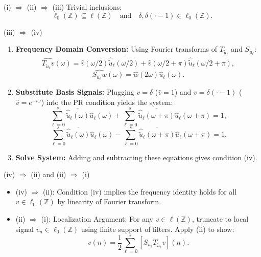 \documentclass{beamer}
\begin{document}
\begin{frame}{(i) $\Rightarrow$ (ii) $\Rightarrow$ (iii)}
    Trivial inclusions:
    \[
        \ell_0(\mathbb{Z})\subseteq \ell(\mathbb{Z})\quad\text{and}\quad \delta,\delta(\cdot-1)\in\ell_0(\mathbb{Z}).
    \]
\end{frame}

\begin{frame}{(iii) $\Rightarrow$ (iv)}
    \begin{enumerate}
        \item \textbf{Frequency Domain Conversion:} Using Fourier transforms of $T_{\tilde{u}_\ell}$ and $S_{u_\ell}$:
              \[
                  \widehat{T_{\tilde{u}_\ell} v}(\omega) = \hat{v}(\omega/2)\overline{\hat{\tilde{u}}_\ell(\omega/2)} + \hat{v}(\omega/2+\pi)\overline{\hat{\tilde{u}}_\ell(\omega/2+\pi)},
              \]
              \[
                  \widehat{S_{u_\ell} w}(\omega) = \hat{w}(2\omega)\hat{u}_\ell(\omega).
              \]

        \item \textbf{Substitute Basis Signals:} Plugging $v = \delta$ ($\hat{v}=1$) and $v = \delta(\cdot-1)$ ($\hat{v}=e^{-i\omega}$) into the PR condition yields the system:
              \[
                  \sum_{\ell=0}^s \overline{\hat{\tilde{u}}_\ell(\omega)}\hat{u}_\ell(\omega) + \sum_{\ell=0}^s \overline{\hat{\tilde{u}}_\ell(\omega+\pi)}\hat{u}_\ell(\omega+\pi) = 1,
              \]
              \[
                  \sum_{\ell=0}^s \overline{\hat{\tilde{u}}_\ell(\omega)}\hat{u}_\ell(\omega) - \sum_{\ell=0}^s \overline{\hat{\tilde{u}}_\ell(\omega+\pi)}\hat{u}_\ell(\omega+\pi) = 1.
              \]

        \item \textbf{Solve System:} Adding and subtracting these equations gives condition (iv).
    \end{enumerate}
\end{frame}

\begin{frame}{(iv) $\Rightarrow$ (ii) and (ii) $\Rightarrow$ (i)}
    \begin{itemize}
        \item (iv) $\Rightarrow$ (ii): Condition (iv) implies the frequency identity holds for all $v \in \ell_0(\mathbb{Z})$ by linearity of Fourier transform.
        \item (ii) $\Rightarrow$ (i):  {Localization Argument:} For any $v \in \ell(\mathbb{Z})$, truncate to local signal $v_n \in \ell_0(\mathbb{Z})$ using finite support of filters. Apply (ii) to show:
              \[
                  v(n) = \frac{1}{2}\sum_{\ell=0}^s [S_{u_\ell} T_{\tilde{u}_\ell} v](n).
              \]
    \end{itemize}
\end{frame}
\end{document}
